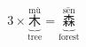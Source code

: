 \[ 3\times \underbrace{\overset{\text{mù}}{\text{木}}}_{\text{tree}} = \underbrace{\overset{\text{sēn}}{\text{森}}}_{\text{forest}} \]
